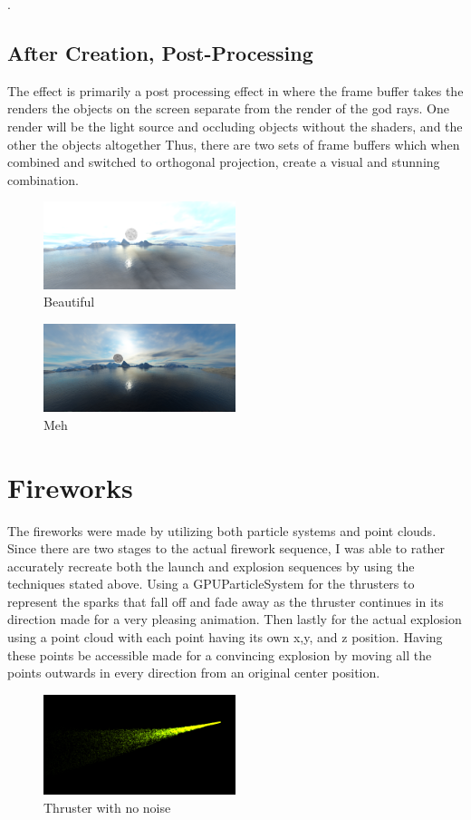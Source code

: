 .\subsection{After Creation, Post-Processing}

The effect is primarily a post processing effect in where the frame buffer takes the renders the objects on the screen separate from the render of the god rays. One render will be the light source and occluding objects without the shaders, and the other the objects altogether Thus, there are two sets of frame buffers which when combined and switched to orthogonal projection, create a visual and stunning combination. 

\begin{figure}
\includegraphics[width=0.5\textwidth]{god_rays_on} 
\caption{Beautiful}
\end{figure}
\begin{figure}
\includegraphics[width=0.5\textwidth]{godrays_off} 
\caption{Meh}
\end{figure}
\section{Fireworks}
The fireworks were made by utilizing both particle systems and point clouds. Since there are two
stages to the actual firework sequence, I was able to rather accurately recreate both the launch
and explosion sequences by using the techniques stated above. Using a GPUParticleSystem for
the thrusters to represent the sparks that fall off and fade away as the thruster continues in its
direction made for a very pleasing animation. Then lastly for the actual explosion using a point
cloud with each point having its own x,y, and z position. Having these points be accessible made
for a convincing explosion by moving all the points outwards in every direction from an original
center position.
\begin{figure}
\includegraphics[width=0.5\textwidth]{eric1}
\caption{Thruster with no noise}
\end{figure}
